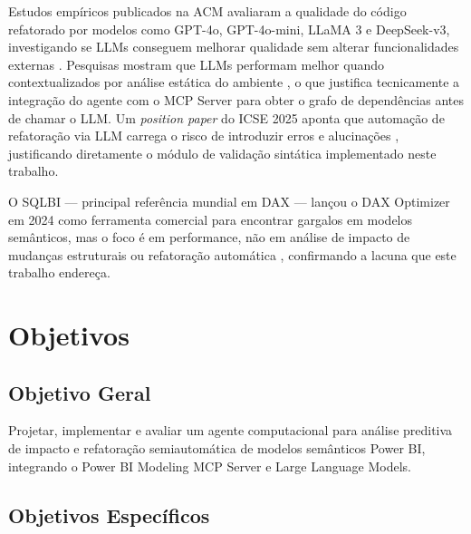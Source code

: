 \documentclass[
    12pt,               %
    openright,          %
    oneside,            %
    a4paper,            %
    chapter=TITLE,      %
    section=TITLE,      %
    brazil              %
]{abntex2}
\begin{document}
Estudos empíricos publicados na ACM avaliaram a qualidade do código refatorado por modelos como GPT-4o, GPT-4o-mini, LLaMA 3 e DeepSeek-v3, investigando se LLMs conseguem melhorar qualidade sem alterar funcionalidades externas \cite{cordeiro2024llmrefactor}. Pesquisas mostram que LLMs performam melhor quando contextualizados por análise estática do ambiente \cite{zhang2024staticllm}, o que justifica tecnicamente a integração do agente com o MCP Server para obter o grafo de dependências antes de chamar o LLM. Um \textit{position paper} do ICSE 2025 aponta que automação de refatoração via LLM carrega o risco de introduzir erros e alucinações \cite{icse2025llmrefactor}, justificando diretamente o módulo de validação sintática implementado neste trabalho.

O SQLBI — principal referência mundial em DAX — lançou o DAX Optimizer em 2024 como ferramenta comercial para encontrar gargalos em modelos semânticos, mas o foco é em performance, não em análise de impacto de mudanças estruturais ou refatoração automática \cite{sqlbi2024optimizer}, confirmando a lacuna que este trabalho endereça.

\section{Objetivos}

\subsection{Objetivo Geral}

Projetar, implementar e avaliar um agente computacional para análise preditiva de impacto e refatoração semiautomática de modelos semânticos Power BI, integrando o Power BI Modeling MCP Server e Large Language Models.

\subsection{Objetivos Específicos}
\end{document}
